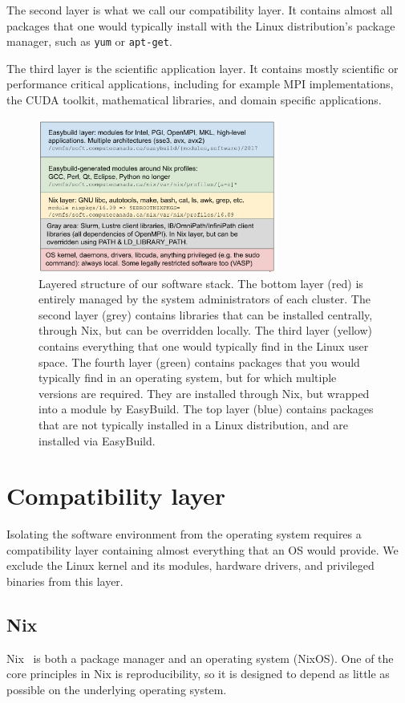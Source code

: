 \documentclass[sigconf]{acmart}
\begin{document}
The second layer is what we call our compatibility layer. It contains almost all packages that one would typically install with the Linux distribution's package manager, such as \texttt{yum} or \texttt{apt-get}. 

The third layer is the scientific application layer. It contains mostly scientific or performance critical applications, including for example MPI implementations, the CUDA toolkit, mathematical libraries, and domain specific applications. 

\begin{figure}
  \includegraphics[width=0.7\textwidth]{layers.png}
  \caption{Layered structure of our software stack. The bottom layer (red) is entirely managed by the system administrators of each cluster. The second layer (grey) contains libraries that can be installed centrally, through Nix, but can be overridden locally. The third layer (yellow) contains everything that one would typically find in the Linux user space. The fourth layer (green) contains packages that you would typically find in an operating system, but for which multiple versions are required. They are installed through Nix, but wrapped into a module by EasyBuild. The top layer (blue) contains packages that are not typically installed in a Linux distribution, and are installed via EasyBuild.}
  \label{tab:layers}
\end{figure}

\section{Compatibility layer}
\label{sec:Compatibility_layer}
Isolating the software environment from the operating system requires a compatibility layer containing almost everything that an OS would provide. We exclude the Linux kernel and its modules, hardware drivers, and privileged binaries from this layer.

\subsection{Nix}
\label{sub:Nix}
Nix~\cite{Nix} is both a package manager and an operating system (NixOS). One of the core principles in Nix is reproducibility, so it is designed to depend as little as possible on the underlying operating system. 
\end{document}

